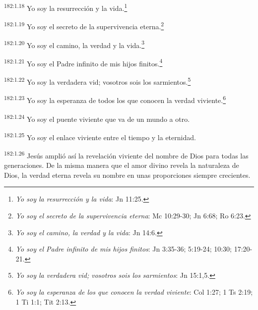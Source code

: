 \par 
\textsuperscript{182:1.18} Yo soy la resurrección y la vida.\footnote{\textit{Yo soy la resurrección y la vida}: Jn 11:25.}

\par 
\textsuperscript{182:1.19} Yo soy el secreto de la supervivencia eterna.\footnote{\textit{Yo soy el secreto de la supervivencia eterna}: Mc 10:29-30; Jn 6:68; Ro 6:23.}

\par 
\textsuperscript{182:1.20} Yo soy el camino, la verdad y la vida.\footnote{\textit{Yo soy el camino, la verdad y la vida}: Jn 14:6.}

\par 
\textsuperscript{182:1.21} Yo soy el Padre infinito de mis hijos finitos.\footnote{\textit{Yo soy el Padre infinito de mis hijos finitos}: Jn 3:35-36; 5:19-24; 10:30; 17:20-21.}

\par 
\textsuperscript{182:1.22} Yo soy la verdadera vid; vosotros sois los sarmientos.\footnote{\textit{Yo soy la verdadera vid; vosotros sois los sarmientos}: Jn 15:1,5.}

\par 
\textsuperscript{182:1.23} Yo soy la esperanza de todos los que conocen la verdad viviente.\footnote{\textit{Yo soy la esperanza de los que conocen la verdad viviente}: Col 1:27; 1 Ts 2:19; 1 Ti 1:1; Tit 2:13.}

\par 
\textsuperscript{182:1.24} Yo soy el puente viviente que va de un mundo a otro.

\par 
\textsuperscript{182:1.25} Yo soy el enlace viviente entre el tiempo y la eternidad.

\par 
\textsuperscript{182:1.26} Jesús amplió así la revelación viviente del nombre de Dios para todas las generaciones. De la misma manera que el amor divino revela la naturaleza de Dios, la verdad eterna revela su nombre en unas proporciones siempre crecientes.

